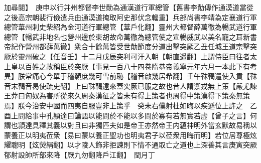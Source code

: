 加尋閱】　庚申以行并州都督李世勣為通漢道行軍總管【舊書李勣傳作通漠道當從之後高宗朝裴行儉遣兵由通漠道掩取阿史那伏念輜重】兵部尚書李靖為定襄道行軍總管華州刺史柴紹為金河道行軍總管【華戶化翻】靈州大都督薛萬徹為暢武道行軍總管【暢武非地名也營州邊於東胡故命萬徹為總管使之宣暢威武以美名寵之耳新書帝紀作營州都薛萬徹】衆合十餘萬皆受世勣節度分道出擊突厥乙丑任城王道宗擊突厥於靈州破之【任音壬】十二月戊辰突利可汗入朝【朝直遥翻】上謂侍臣曰往者太上皇以百姓之故稱臣於突厥【事見一百八十四卷隋恭帝義寧元年六月一本此下有考異】朕常痛心今單于稽顙庶幾可雪前恥【稽音啟幾居希翻】壬午靺鞨遣使入貢【靺音末鞨音曷使疏吏翻】上曰靺鞨遠來蓋突厥已服之故也昔人謂禦戎無上策【嚴尤諫王莽曰匈奴為害所從來久周秦漢征之皆未有得上策者也周得中策漢得下策秦無策焉】朕今治安中國而四夷自服豈非上策乎　癸未右僕射杜如晦以疾遜位上許之　乙酉上問給事中孔頴達曰論語以能問於不能以多問於寡有若無實若虚【曾子之言】何謂也頴達具釋其義以對且曰非獨匹夫如是帝王亦然帝王内藴神明外當玄默故易稱以蒙養正以明夷莅衆【易曰蒙以養正聖功也明夷君子以莅衆用晦而明】若位居尊極炫耀聰明【炫熒絹翻】以才陵人飾非拒諫則下情不通取亡之道也上深善其言庚寅突厥郁射設帥所部來降【厥九勿翻降戶江翻】　閏月丁

